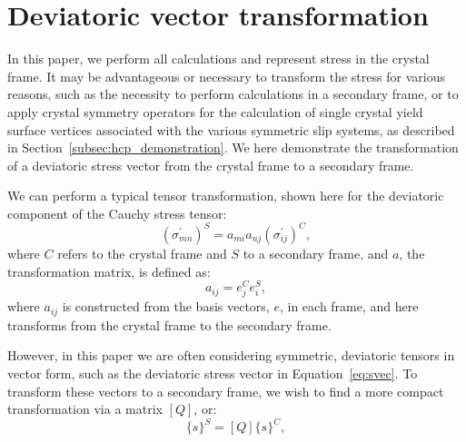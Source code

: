 \documentclass[preprint,3p,times,sort&compress,letterpaper,12pt]{elsarticle} %
\begin{document}



\appendix

\section{Deviatoric vector transformation}
\label{sec:transform}

In this paper, we perform all calculations and represent stress in the crystal frame. It may be advantageous or necessary to transform the stress for various reasons, such as the necessity to perform calculations in a secondary frame, or to apply crystal symmetry operators for the calculation of single crystal yield surface vertices associated with the various symmetric slip systems, as described in Section~\ref{subsec:hcp_demonstration}. We here demonstrate the transformation of a deviatoric stress vector from the crystal frame to a secondary frame.

We can perform a typical  tensor transformation, shown here for the deviatoric component of the Cauchy stress tensor:
\begin{equation}
    \label{eq:tenstrans}
    \left(\sigma_{mn}^\prime\right)^S = a_{mi} a_{nj} \left(\sigma_{ij}^\prime\right)^C ,
\end{equation}
where $C$ refers to the crystal frame and $S$ to a secondary frame, and $a$, the transformation matrix, is defined as:
\begin{equation}
    \label{eq:Rtrans}
    a_{ij} = e_j^C e_i^S,
\end{equation}
where $a_{ij}$ is constructed from the basis vectors, $e$, in each frame, and here transforms from the crystal frame to the secondary frame.

However, in this paper we are often considering symmetric, deviatoric tensors in vector form, such as the deviatoric stress vector in Equation~\ref{eq:svec}. To transform these vectors to a secondary frame, we wish to find a more compact transformation via a matrix $\left[Q\right]$, or:
\begin{equation}
    \{s\}^S = \left[Q\right] \{s\}^C,
\end{equation}
\end{document}

